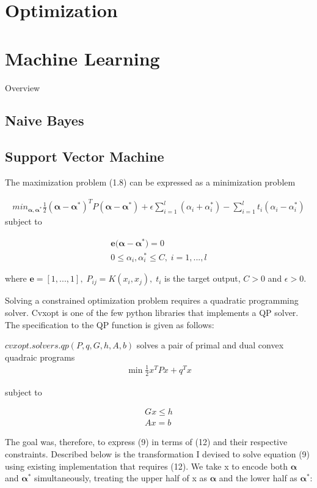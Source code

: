 \documentclass[12pt,twoside,notitlepage]{report}
\begin{document}
\section{Optimization}
\section{Machine Learning}
Overview
\subsection{Naive Bayes}

\subsection{Support Vector Machine}

The maximization problem (1.8) can be expressed as a minimization problem

\begin{gather}
  min_{\bm{\alpha},\bm{\alpha^*}} \frac{1}{2}(\bm{\alpha-\alpha^*})^T P (\bm{\alpha - \alpha^*})+\epsilon 
\sum_{i=1}^{l}(\alpha_i+\alpha_i^*)-\sum_{i=1}^{l}t_i(\alpha_i-\alpha_i^*)
\end{gather}
subject to

\begin{gather}
  \mathbf{e(\bm{\alpha}}-\bm{\alpha^*})=0 \\
  0\leq \alpha_i,\alpha_i^* \leq C, \;i=1,...,l
 \end{gather}

where
\(\mathbf{e}=[1,...,1],\;P_{ij}=K(x_i,x_j),\;t_i\) is the target output, \(C > 0\) and \(\epsilon > 0.\)

Solving a constrained optimization problem requires a quadratic programming solver. Cvxopt is one of the few python
libraries that implements a QP solver. The specification to the QP function is given as follows:

\(cvxopt.solvers.qp(P,q,G,h,A,b)\) solves a pair of primal and dual convex quadraic programs
\begin{gather}
  \min \frac{1}{2} x^T P x + q^T x
\end{gather}

 subject to

\begin{gather}
 G x \leq h\\
  Ax = b
\end{gather}

The goal was, therefore, to express (9) in terms of (12) and their respective constraints.
Described below is the transformation I devised to solve equation (9) using existing implementation that requires (12).
We take x to encode both \(\bm{\alpha}\) and \(\bm{\alpha^*}\) simultaneously, treating the upper half of x as 
\(\bm{\alpha}\) and the lower half 
as \(\bm{\alpha^*}\):
\end{document}
